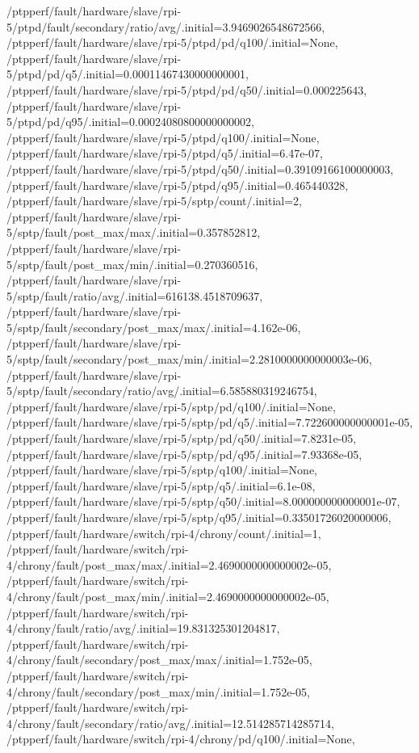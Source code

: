 {    /ptpperf/fault/hardware/slave/rpi-5/ptpd/fault/secondary/ratio/avg/.initial=3.9469026548672566,
    /ptpperf/fault/hardware/slave/rpi-5/ptpd/pd/q100/.initial=None,
    /ptpperf/fault/hardware/slave/rpi-5/ptpd/pd/q5/.initial=0.00011467430000000001,
    /ptpperf/fault/hardware/slave/rpi-5/ptpd/pd/q50/.initial=0.000225643,
    /ptpperf/fault/hardware/slave/rpi-5/ptpd/pd/q95/.initial=0.00024080800000000002,
    /ptpperf/fault/hardware/slave/rpi-5/ptpd/q100/.initial=None,
    /ptpperf/fault/hardware/slave/rpi-5/ptpd/q5/.initial=6.47e-07,
    /ptpperf/fault/hardware/slave/rpi-5/ptpd/q50/.initial=0.39109166100000003,
    /ptpperf/fault/hardware/slave/rpi-5/ptpd/q95/.initial=0.465440328,
    /ptpperf/fault/hardware/slave/rpi-5/sptp/count/.initial=2,
    /ptpperf/fault/hardware/slave/rpi-5/sptp/fault/post_max/max/.initial=0.357852812,
    /ptpperf/fault/hardware/slave/rpi-5/sptp/fault/post_max/min/.initial=0.270360516,
    /ptpperf/fault/hardware/slave/rpi-5/sptp/fault/ratio/avg/.initial=616138.4518709637,
    /ptpperf/fault/hardware/slave/rpi-5/sptp/fault/secondary/post_max/max/.initial=4.162e-06,
    /ptpperf/fault/hardware/slave/rpi-5/sptp/fault/secondary/post_max/min/.initial=2.2810000000000003e-06,
    /ptpperf/fault/hardware/slave/rpi-5/sptp/fault/secondary/ratio/avg/.initial=6.585880319246754,
    /ptpperf/fault/hardware/slave/rpi-5/sptp/pd/q100/.initial=None,
    /ptpperf/fault/hardware/slave/rpi-5/sptp/pd/q5/.initial=7.722600000000001e-05,
    /ptpperf/fault/hardware/slave/rpi-5/sptp/pd/q50/.initial=7.8231e-05,
    /ptpperf/fault/hardware/slave/rpi-5/sptp/pd/q95/.initial=7.93368e-05,
    /ptpperf/fault/hardware/slave/rpi-5/sptp/q100/.initial=None,
    /ptpperf/fault/hardware/slave/rpi-5/sptp/q5/.initial=6.1e-08,
    /ptpperf/fault/hardware/slave/rpi-5/sptp/q50/.initial=8.000000000000001e-07,
    /ptpperf/fault/hardware/slave/rpi-5/sptp/q95/.initial=0.33501726020000006,
    /ptpperf/fault/hardware/switch/rpi-4/chrony/count/.initial=1,
    /ptpperf/fault/hardware/switch/rpi-4/chrony/fault/post_max/max/.initial=2.4690000000000002e-05,
    /ptpperf/fault/hardware/switch/rpi-4/chrony/fault/post_max/min/.initial=2.4690000000000002e-05,
    /ptpperf/fault/hardware/switch/rpi-4/chrony/fault/ratio/avg/.initial=19.831325301204817,
    /ptpperf/fault/hardware/switch/rpi-4/chrony/fault/secondary/post_max/max/.initial=1.752e-05,
    /ptpperf/fault/hardware/switch/rpi-4/chrony/fault/secondary/post_max/min/.initial=1.752e-05,
    /ptpperf/fault/hardware/switch/rpi-4/chrony/fault/secondary/ratio/avg/.initial=12.514285714285714,
    /ptpperf/fault/hardware/switch/rpi-4/chrony/pd/q100/.initial=None,
}
